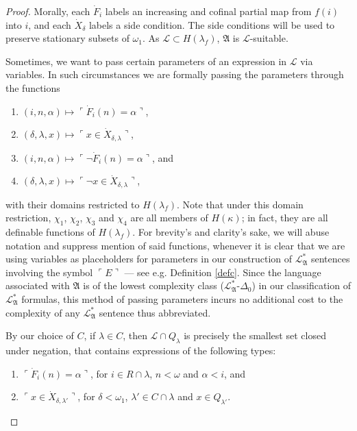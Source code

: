 \documentclass[12pt]{article}
\numberwithin{equation}{section}
\begin{document}
\begin{proof}
Morally, each $\dot{F}_i$ labels an increasing and cofinal partial map from $f(i)$ into $i$, and each $\dot{X}_{\delta}$ labels a side condition. The side conditions will be used to preserve stationary subsets of $\omega_1$. As $\mathcal{L} \subset H(\lambda_f)$, $\mathfrak{A}$ is $\mathcal{L}$-suitable.

\begin{rem}\label{rempp}
Sometimes, we want to pass certain parameters of an expression in $\mathcal{L}$ via variables. In such circumstances we are formally passing the parameters through the functions
\begin{enumerate}[label=$\chi_{\arabic*} :$, leftmargin=45pt]
    \item $(i, n, \alpha) \mapsto \ulcorner \dot{F}_i (n) = \alpha \urcorner$,
    \item $(\delta, \lambda, x) \mapsto \ulcorner x \in \dot{X}_{\delta, \lambda} \urcorner$,
    \item $(i, n, \alpha) \mapsto \ulcorner \neg \dot{F}_i (n) = \alpha \urcorner$, and
    \item $(\delta, \lambda, x) \mapsto \ulcorner \neg x \in \dot{X}_{\delta, \lambda} \urcorner$,
\end{enumerate}
with their domains restricted to $H(\lambda_f)$. Note that under this domain restriction, $\chi_1$, $\chi_2$, $\chi_3$ and $\chi_4$ are all members of $H(\kappa)$; in fact, they are all definable functions of $H(\lambda_f)$. For brevity's and clarity's sake, we will abuse notation and suppress mention of said functions, whenever it is clear that we are using variables as placeholders for parameters in our construction of $\mathcal{L}^{*}_{\mathfrak{A}}$ sentences involving the symbol $\ulcorner E \urcorner$ --- see e.g. Definition \ref{defc}. Since the language associated with $\mathfrak{A}$ is of the lowest complexity class ($\mathcal{L}^{*}_{\mathfrak{A}}$-$\Delta_0$) in our classification of $\mathcal{L}^{*}_{\mathfrak{A}}$ formulas, this method of passing parameters incurs no additional cost to the complexity of any $\mathcal{L}^{*}_{\mathfrak{A}}$ sentence thus abbreviated.
\end{rem}

By our choice of $C$, if $\lambda \in C$, then $\mathcal{L} \cap Q_{\lambda}$ is precisely the smallest set closed under negation, that contains expressions of the following types: 
\begin{enumerate}[label=(L\arabic*)$_{\lambda}$, leftmargin=45pt]
    \item\label{l1lamb} $\ulcorner \dot{F}_i (n) = \alpha \urcorner$, for $i \in R \cap \lambda$, $n < \omega$ and $\alpha < i$, and
    \item\label{l2lamb} $\ulcorner x \in \dot{X}_{\delta, \lambda'} \urcorner$, for $\delta < \omega_1$, $\lambda' \in C \cap \lambda$ and $x \in Q_{\lambda'}$.
\end{enumerate}


\end{proof}
\end{document}

